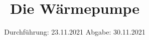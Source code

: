 

\subject{V206}
\title{Die Wärmepumpe}
\date{%
  Durchführung: 23.11.2021
  \hspace{3em}
  Abgabe: 30.11.2021
}



\maketitle
\thispagestyle{empty}
\tableofcontents
\newpage





\newpage




\newpage

\printbibliography{}



